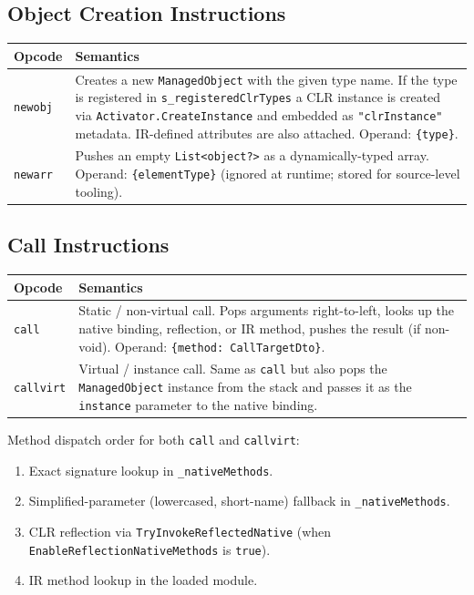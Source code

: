 \documentclass[11pt,a4paper]{article}
\newcommand{\code}[1]{\texttt{\small #1}}
\newcommand{\typename}[1]{\textcolor{typecolor}{\texttt{\small #1}}}
\begin{document}
\subsection{Object Creation Instructions}

\begin{longtable}{lp{10cm}}
  \toprule
  \textbf{Opcode} & \textbf{Semantics} \\
  \midrule
  \endhead
  \code{newobj} & Creates a new \typename{ManagedObject} with the given type name.
                  If the type is registered in \code{s\_registeredClrTypes} a CLR
                  instance is created via \code{Activator.CreateInstance} and
                  embedded as \code{"clrInstance"} metadata. IR-defined attributes
                  are also attached. Operand: \code{\{type\}}. \\
  \code{newarr} & Pushes an empty \code{List<object?>} as a dynamically-typed array.
                  Operand: \code{\{elementType\}} (ignored at runtime; stored for
                  source-level tooling). \\
  \bottomrule
\end{longtable}

\subsection{Call Instructions}

\begin{longtable}{lp{10cm}}
  \toprule
  \textbf{Opcode} & \textbf{Semantics} \\
  \midrule
  \endhead
  \code{call}     & Static / non-virtual call. Pops arguments right-to-left, looks up
                    the native binding, reflection, or IR method, pushes the result
                    (if non-void). Operand: \code{\{method: CallTargetDto\}}. \\
  \code{callvirt} & Virtual / instance call. Same as \code{call} but also pops the
                    \typename{ManagedObject} instance from the stack and passes it as
                    the \code{instance} parameter to the native binding. \\
  \bottomrule
\end{longtable}

Method dispatch order for both \code{call} and \code{callvirt}:

\begin{enumerate}[leftmargin=2em]
  \item Exact signature lookup in \code{\_nativeMethods}.
  \item Simplified-parameter (lowercased, short-name) fallback in
        \code{\_nativeMethods}.
  \item CLR reflection via \code{TryInvokeReflectedNative} (when
        \code{EnableReflectionNativeMethods} is \code{true}).
  \item IR method lookup in the loaded module.
\end{enumerate}
\end{document}
